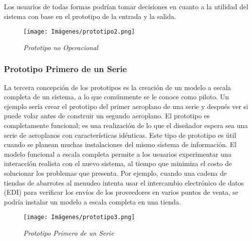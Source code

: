 Los usuarios de todas formas podrían tomar decisiones en cuanto a la utilidad del sistema con base en el prototipo de la entrada y la salida.

\begin{figure}[h!]
    \centering
    \texttt{[image: Imágenes/prototipo2.png]}
    \caption{\textit{Prototipo no Operacional}}
    \label{exemploLabel}
    \end{figure}
    
\subsubsection{Prototipo Primero de un Serie}
La tercera concepción de los prototipos es la creación de un modelo a escala completa de un sistema, a lo que comúnmente se le conoce como piloto. Un ejemplo sería crear el prototipo del primer aeroplano de una serie y después ver si puede volar antes de construir un segundo aeroplano. El prototipo es completamente funcional; es una realización de lo que el diseñador espera sea una serie de aeroplanos con características idénticas. Este tipo de prototipo es útil cuando se planean muchas instalaciones del mismo sistema de información. El modelo funcional a escala completa permite a los usuarios experimentar una interacción realista con el nuevo sistema, al tiempo que minimiza el costo de solucionar los problemas que presenta. Por ejemplo, cuando una cadena de tiendas de abarrotes al menudeo intenta usar el intercambio electrónico de datos (EDI) para verificar los envíos de los proveedores en varios puntos de venta, se podría instalar un modelo a escala completa en una tienda.

\begin{figure}[h!]
    \centering
    \texttt{[image: Imágenes/prototipo3.png]}
    \caption{\textit{Prototipo Primero de un Serie}}
    \label{exemploLabel}
    \end{figure}
    
